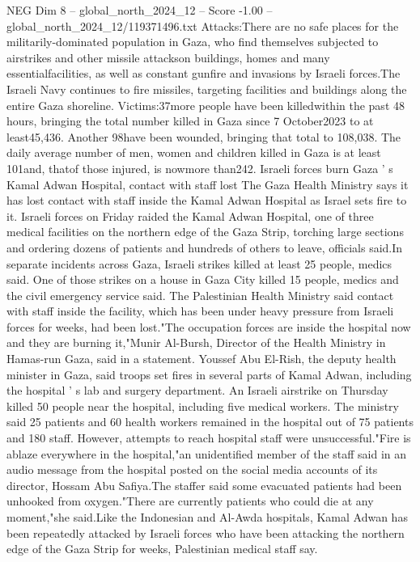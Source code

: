\begin{textsample}{NEG Dim 8 – global\_north\_2024\_12 – Score -1.00 – global\_north\_2024\_12/119371496.txt}  \label{ex:f8_neg_115}
Attacks:There are no safe places for the militarily-dominated population in Gaza, who find themselves subjected to airstrikes and other missile attackson buildings, homes and many essentialfacilities, as well as constant gunfire and invasions by Israeli forces.The Israeli Navy continues to fire missiles, targeting facilities and buildings along the entire Gaza shoreline.
Victims:37more people have been killedwithin the past 48 hours, bringing the total number killed in Gaza since 7 October2023 to at least45,436.
Another 98have been wounded, bringing that total to 108,038.
The daily average number of men, women and children killed in Gaza is at least 101and, thatof those injured, is nowmore than242.
Israeli forces burn Gaza ' s Kamal Adwan Hospital, contact with staff lost The Gaza Health Ministry says it has lost contact with staff inside the Kamal Adwan Hospital as Israel sets fire to it.
Israeli forces on Friday raided the Kamal Adwan Hospital, one of three medical facilities on the northern edge of the Gaza Strip, torching large sections and ordering dozens of patients and hundreds of others to leave, officials said.In separate incidents across Gaza, Israeli strikes killed at least 25 people, medics said.
One of those strikes on a house in Gaza City killed 15 people, medics and the civil emergency service said.
The Palestinian Health Ministry said contact with staff inside the facility, which has been under heavy pressure from Israeli forces for weeks, had been lost."The occupation forces are inside the hospital now and they are burning it,"Munir Al-Bursh, Director of the Health Ministry in Hamas-run Gaza, said in a statement.
Youssef Abu El-Rish, the deputy health minister in Gaza, said troops set fires in several parts of Kamal Adwan, including the hospital ' s lab and surgery department.
An Israeli airstrike on Thursday killed 50 people near the hospital, including five medical workers.
The ministry said 25 patients and 60 health workers remained in the hospital out of 75 patients and 180 staff.
However, attempts to reach hospital staff were unsuccessful."Fire is ablaze everywhere in the hospital,"an unidentified member of the staff said in an audio message from the hospital posted on the social media accounts of its director, Hossam Abu Safiya.The staffer said some evacuated patients had been unhooked from oxygen."There are currently patients who could die at any moment,"she said.Like the Indonesian and Al-Awda hospitals, Kamal Adwan has been repeatedly attacked by Israeli forces who have been attacking the northern edge of the Gaza Strip for weeks, Palestinian medical staff say.

\end{textsample}

